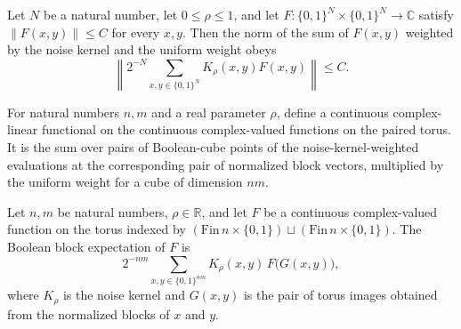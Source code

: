 \begin{lemma}
\label{BooleanAnalysis.GaussianSpace.norm_booleanNoiseExpectation_le}
\leanok
{}
Let $N$ be a natural number, let $0\leq\rho\leq1$, and let
$F:\{0,1\}^N\times\{0,1\}^N\to\mathbb C$ satisfy $\|F(x,y)\|\leq C$ for every $x,y$.
Then the norm of the sum of $F(x,y)$ weighted by the noise kernel and the uniform weight
obeys
\[
\left\|2^{-N}\sum_{x,y\in\{0,1\}^N}K_\rho(x,y)F(x,y)\right\|\leq C.
\]
\end{lemma}

\begin{definition}
\label{BooleanAnalysis.GaussianSpace.booleanBlockExpectation}
\leanok
{}
For natural numbers $n,m$ and a real parameter $\rho$, define a continuous
complex-linear functional on the continuous complex-valued functions on the paired
torus. It is the sum over pairs of Boolean-cube points of the noise-kernel-weighted
evaluations at the corresponding pair of normalized block vectors, multiplied by the
uniform weight for a cube of dimension $nm$.
\end{definition}

\begin{lemma}
\label{BooleanAnalysis.GaussianSpace.booleanBlockExpectation_apply}
\leanok
{}
Let $n,m$ be natural numbers, $\rho\in\mathbb R$, and let $F$ be a continuous
complex-valued function on the torus indexed by
$(\mathrm{Fin}\,n\times\{0,1\})\sqcup(\mathrm{Fin}\,n\times\{0,1\})$. The Boolean block
expectation of $F$ is
\[
2^{-nm}\sum_{x,y\in\{0,1\}^{nm}}K_\rho(x,y)\,F\bigl(G(x,y)\bigr),
\]
where $K_\rho$ is the noise kernel and $G(x,y)$ is the pair of torus images obtained
from the normalized blocks of $x$ and $y$.
\end{lemma}

